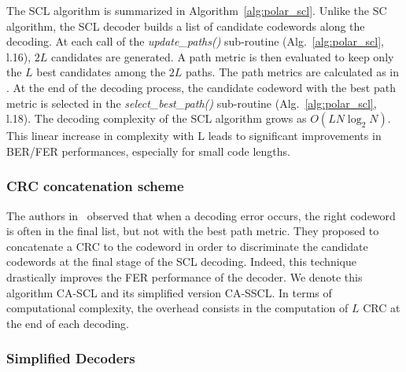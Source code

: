 The SCL algorithm is summarized in Algorithm~\ref{alg:polar_scl}. Unlike the SC
algorithm, the SCL decoder builds a list of candidate codewords along the
decoding. At each call of the \textit{update\_paths()} sub-routine
(Alg.~\ref{alg:polar_scl}, l.16), $2L$ candidates are generated. A path metric
is then evaluated to keep only the $L$ best candidates among the $2L$ paths. The
path metrics are calculated as in \cite{Balatsoukas-Stimming2015}. At the end of
the decoding process, the candidate codeword with the best path metric is
selected in the \textit{select\_best\_path()} sub-routine
(Alg.~\ref{alg:polar_scl}, l.18). The decoding complexity of the SCL algorithm
grows as $O(LN\log_2N)$. This linear increase in complexity with L leads to
significant improvements in BER/FER performances, especially for small code
lengths.

\subsubsection{CRC concatenation scheme}

The authors in~\cite{Tal2011} observed that when a decoding error occurs, the
right codeword is often in the final list, but not with the best path metric.
They proposed to concatenate a CRC to the codeword in order to discriminate the
candidate codewords at the final stage of the SCL decoding. Indeed, this
technique drastically improves the FER performance of the decoder. We denote
this algorithm CA-SCL and its simplified version CA-SSCL. In terms of
computational complexity, the overhead consists in the computation of $L$ CRC at
the end of each decoding.

\subsubsection{Simplified Decoders}
\label{sec:alg_polar_simplified_decoders}

